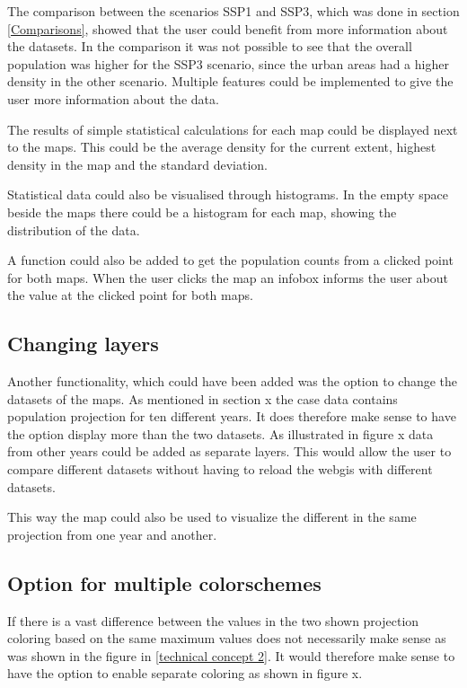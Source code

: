 The comparison between the scenarios SSP1 and SSP3, which was done in section \ref{Comparisons}, showed that the user could benefit from more information about the datasets. In the comparison it was not possible to see that the overall population was higher for the SSP3 scenario, since the urban areas had a higher density in the other scenario. Multiple features could be implemented to give the user more information about the data.

The results of simple statistical calculations for each map could be displayed next to the maps. This could be the average density for the current extent, highest density in the map and the standard deviation.

Statistical data could also be visualised through histograms. In the empty space beside the maps there could be a histogram for each map, showing the distribution of the data. 

A function could also be added to get the population counts from a clicked point for both maps. When the user clicks the map an infobox informs the user about the value at the clicked point for both maps. 





\subsection{Changing layers}
Another functionality, which could have been added was the option to change the datasets of the maps. As mentioned in section x the case data contains population projection for ten different years. It does therefore make sense to have the option display more than the two datasets.  As illustrated in figure x data from other years could be added as separate layers. This would allow the user to compare different datasets without having to reload the webgis with different datasets.

This way the map could also be used to visualize the different in the same projection from one year and another.
\subsection{Option for multiple colorschemes}
If there is a vast difference between the values in the two shown projection coloring based on the same maximum values does not necessarily make sense as was shown in the figure in \ref{technical concept 2}. It would therefore make sense to have the option to enable separate coloring as shown in figure x. 




